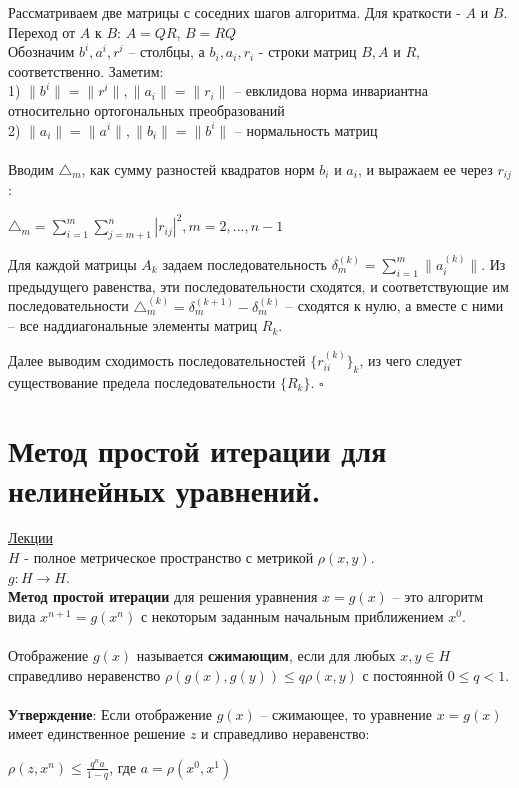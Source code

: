 \documentclass[specialist, subf, href, colorlinks=true, 12pt, times, mtpro, final]{disser}
\theoremstyle{definition}
\begin{document}
Рассматриваем две матрицы с соседних шагов алгоритма. Для краткости - $A$ и $B$. \\
Переход от $A$ к $B$: $A = QR$, $B = RQ$\\

Обозначим $b^i, a^i, r^i$ \--- столбцы, а $b_i, a_i, r_i$ - строки матриц $B, A$ и $R$, соответственно. 
Заметим:\\
1) $\|b^i\| = \|r^i\|, \|a_i\| = \|r_i\|$ \--- евклидова норма инвариантна относительно ортогональных преобразований\\
2) $\|a_i\| = \|a^i\|, \|b_i\| = \|b^i\|$ \--- нормальность матриц\\
\\
Вводим $\triangle_m$, как сумму разностей квадратов норм $b_i$ и $a_i$, и выражаем ее через $r_{ij}$:
\begin{center}
$\triangle_m = \sum\limits^m_{i=1} \sum\limits^n_{j=m+1} |r_{ij}|^2, m =2, ... , n-1$
\end{center}

Для каждой матрицы $A_k$ задаем последовательность $\delta^{(k)}_m = \sum\limits^m_{i=1} \|a^{(k)}_i\|$. Из предыдущего равенства, эти последовательности сходятся, и соответствующие им последовательности $\triangle^{(k)}_m = \delta^{(k+1)}_m - \delta^{(k)}_m$ \--- сходятся к нулю, а вместе с ними \--- все наддиагональные элементы матриц $R_k$.

Далее выводим сходимость последовательностей $\{r^{(k)}_{ii}\}_k$, из чего следует существование предела последовательности $\{R_k\}$. $\square$



\section {Метод простой итерации для нелинейных уравнений.}
	\hyperlink {lects.82}{Лекции}\\
	
$H$	 - полное метрическое пространство с метрикой $\rho(x,y)$.\\
$g:H \rightarrow H$.\\

\textbf{Метод простой итерации} для решения уравнения $x = g(x)$ \--- это алгоритм вида $x^{n+1} = g(x^n)$ с некоторым заданным начальным приближением $x^0$.\\
\\
Отображение $g(x)$ называется \textbf{сжимающим}, если для любых $x, y \in H$ справедливо неравенство $\rho(g(x), g(y)) \leq q\rho(x,y)$ с постоянной $0 \leq q < 1$.\\
\\
\textbf{Утверждение}: Если отображение $g(x)$ \--- сжимающее, то уравнение $x=g(x)$  имеет единственное решение $z$ и справедливо неравенство:
\begin{center}
$\rho (z, x^n) \leq \frac{q^na}{1-q}$, где $a = \rho (x^0, x^1)$
\end{center}
\end{document}

